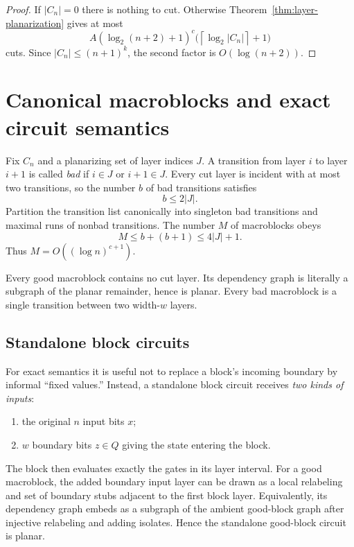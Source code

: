 \documentclass[11pt]{article}
\theoremstyle{definition}
\newcommand{\ceil}[1]{\left\lceil #1\right\rceil}
\begin{document}
\begin{proof}
If $|C_n|=0$ there is nothing to cut.  Otherwise
Theorem~\ref{thm:layer-planarization} gives at most
\[
 A(\log_2(n+2)+1)^c
 \bigl(\ceil{\log_2|C_n|}+1\bigr)
\]
cuts.  Since $|C_n|\le(n+1)^k$, the second factor is
$O(\log(n+2))$.
\end{proof}

\section{Canonical macroblocks and exact circuit semantics}\label{sec:macroblocks}

Fix $C_n$ and a planarizing set of layer indices $J$.  A transition from layer
$i$ to layer $i+1$ is called \emph{bad} if $i\in J$ or $i+1\in J$.  Every cut
layer is incident with at most two transitions, so the number $b$ of bad
transitions satisfies
\[
  b\le 2|J|.
\]
Partition the transition list canonically into singleton bad transitions and
maximal runs of nonbad transitions.  The number $M$ of macroblocks obeys
\[
  M\le b+(b+1)\le 4|J|+1.
\]
Thus $M=O((\log n)^{c+1})$.

Every good macroblock contains no cut layer.  Its dependency graph is literally
a subgraph of the planar remainder, hence is planar.  Every bad macroblock is
a single transition between two width-$w$ layers.

\subsection{Standalone block circuits}

For exact semantics it is useful not to replace a block's incoming boundary by
informal ``fixed values.''  Instead, a standalone block circuit receives
\emph{two kinds of inputs}:
\begin{enumerate}
  \item the original $n$ input bits $x$;
  \item $w$ boundary bits $z\in Q$ giving the state entering the block.
\end{enumerate}
The block then evaluates exactly the gates in its layer interval.  For a good
macroblock, the added boundary input layer can be drawn as a local relabeling
and set of boundary stubs adjacent to the first block layer.  Equivalently,
its dependency graph embeds as a subgraph of the ambient good-block graph after
injective relabeling and adding isolates.  Hence the standalone good-block
circuit is planar.
\end{document}
